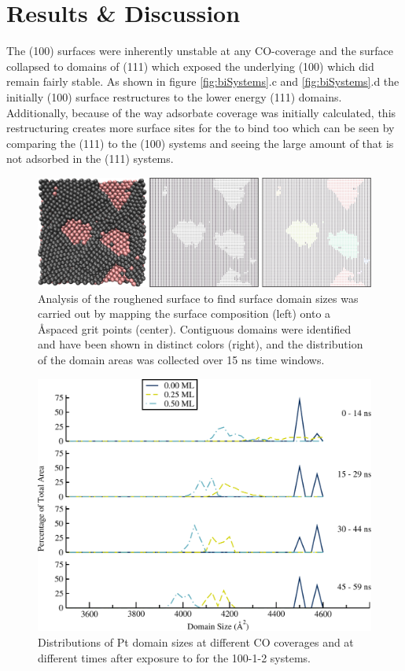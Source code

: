\section{Results \& Discussion}
The (100) surfaces were inherently unstable at any CO-coverage and the surface
 collapsed to domains of (111) which exposed the underlying (100)
 which did remain fairly stable. As shown in figure
\ref{fig:biSystems}.c and \ref{fig:biSystems}.d the initially (100) surface
restructures to the lower energy (111) domains. Additionally, because of the
way adsorbate coverage was initially calculated, this restructuring creates
more surface sites for the  to bind too which can be seen by comparing
the (111) to the (100) systems and seeing the large amount of  that is
not adsorbed in the (111) systems.


\begin{figure}[p!]
\centering
  \includegraphics[width=\linewidth]{../figures/appC/grid_small.pdf}
  \caption{Analysis of the roughened surface to find surface domain sizes was
carried out by mapping the surface composition (left) onto a \AA spaced grit
points (center). Contiguous domains were identified and have been shown in
distinct colors (right), and the distribution of the domain areas was collected
over 15 ns time windows.}
\label{fig:surfaceGrid}
\end{figure}


\begin{figure}[p!]
\centering
  \includegraphics[width=\linewidth]{../figures/appC/ds_100_1Pt_2Pd_Pt.pdf}
  \caption{Distributions of Pt domain sizes at different CO coverages and at
different times after exposure to  for the 100-1-2
systems.}
\label{fig:ds100Pt}
\end{figure}


